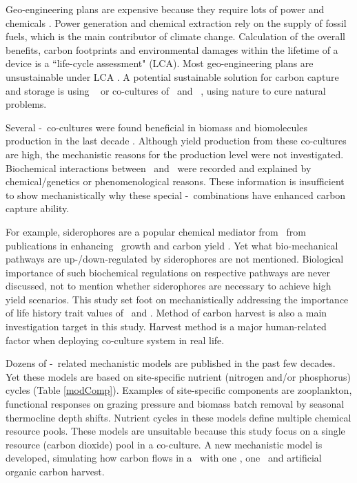 \documentclass[../thesis.tex]{subfiles} %
\begin{document}
Geo-engineering plans are expensive because they require lots of power and chemicals \autocite{boyd2008ranking,boyd2008implications,mcclellan2012cost}.  Power generation and chemical extraction rely on the supply of fossil fuels, which is the main contributor of climate change.  Calculation of the overall benefits, carbon footprints and environmental damages within the lifetime of a device is a ``life-cycle assessment" (LCA).  Most geo-engineering plans are unsustainable under LCA \autocite{abdussalam2020green}.  A potential sustainable solution for carbon capture and storage is using \phy\ \autocite{farrelly2013carbon} or co-cultures of \phy\ and \bac\ \autocite{fuentes2016impact}, using nature to cure natural problems.

Several \phy-\bac\ co-cultures were found beneficial in biomass and biomolecules production in the last decade \autocite{fuentes2016impact,santos2014microalgal}.  Although yield production from these co-cultures are high, the mechanistic reasons for the production level were not investigated.  Biochemical interactions between \phy\ and \bac\ were recorded and explained by chemical/genetics \autocite{amin2009photolysis,durham2015cryptic,leyva2014accumulation,rivas2010interactions,seyedsayamdost2011roseobacticides} or phenomenological \autocite{choix2012enhanced1,choix2012enhanced2,kazamia2012mutualistic,santos2014microalgal} reasons.  These information is insufficient to show mechanistically why these special \phy-\bac\ combinations have enhanced carbon capture ability.

For example, siderophores are a popular chemical mediator from \bac\ from publications in enhancing \phy\ growth and carbon yield \autocite{fuentes2016impact}.  Yet what bio-mechanical pathways are up-/down-regulated by siderophores are not mentioned.  Biological importance of such biochemical regulations on respective pathways are never discussed, not to mention whether siderophores are necessary to achieve high yield scenarios.  This study set foot on mechanistically addressing the importance of life history trait values of \phy\ and \bac.  Method of carbon harvest is also a main investigation target in this study.  Harvest method is a major human-related factor when deploying co-culture system in real life.

Dozens of \phy-\bac\ related mechanistic models are published in the past few decades.  Yet these models are based on site-specific nutrient (nitrogen and/or phosphorus) cycles (Table \ref{modComp}).  Examples of site-specific components are zooplankton, functional responses on grazing pressure and biomass batch removal by seasonal thermocline depth shifts.  Nutrient cycles in these models define multiple chemical resource pools.  These models are unsuitable because this study focus on a single resource (carbon dioxide) pool in a co-culture.  A new mechanistic model is developed, simulating how carbon flows in a \pbs\ with one \phy, one \bacm\ and artificial organic carbon harvest.
\end{document}
